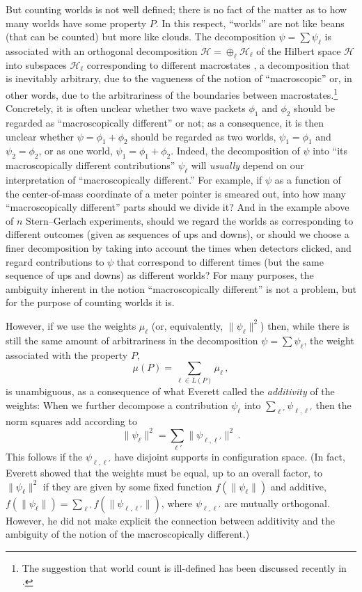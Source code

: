 \documentclass[12pt]{article}
\newcommand{\Hilbert}{\mathscr{H}}
\newcommand{\num}{n}
\newcommand{\Lset}{L}
\newcommand{\z}[1]{{#1}}
\begin{document}
But counting worlds is not well defined; there is no fact of the matter as to how many worlds have some property $P$. In this respect, ``worlds'' are not like beans (that can be counted) but more like clouds. The decomposition $\psi = \sum \psi_\ell$ \z{is associated with} an orthogonal decomposition $\Hilbert=\oplus_\ell \Hilbert_\ell$ of the Hilbert space $\Hilbert$ into subspaces $\Hilbert_\ell$ corresponding to different macrostates \cite{vN}, a decomposition that is inevitably arbitrary, due to the vagueness of the notion of ``macroscopic'' or, in other words, due to the arbitrariness of the boundaries between macrostates.\footnote{\z{The suggestion that world count is ill-defined has been  discussed recently in  \cite{wallace}.}} Concretely, it is often unclear whether two wave packets $\phi_1$ and $\phi_2$ should be regarded as ``macroscopically different'' or not; as a consequence, it is then unclear whether $\psi = \phi_1+\phi_2$ should be regarded as two worlds, $\psi_1=\phi_1$ and $\psi_2=\phi_2$, or as one world, $\psi_1=\phi_1+\phi_2$. Indeed, the decomposition of $\psi$ into ``its macroscopically different contributions'' $\psi_\ell$ will \emph{usually} depend on our interpretation of ``macroscopically different.'' For example, if $\psi$ as a function of the center-of-mass coordinate of a meter pointer is smeared out, into how many ``macroscopically different'' parts should we divide it? 
And in the example above of $\num$ Stern--Gerlach experiments, should we regard the worlds as corresponding to different outcomes (given as sequences of ups and downs), or should we choose a finer decomposition by taking into account the times when detectors clicked, and regard contributions to $\psi$ that correspond to different times (but the same sequence of ups and downs) as different worlds? For many purposes, the ambiguity inherent in the notion ``macroscopically different'' is not a problem, but for the purpose of counting worlds it is.

However, if we use the weights $\mu_\ell$ (or, equivalently, $\|\psi_\ell\|^2$) then, while there is still the same amount of arbitrariness in the decomposition $\psi=\sum\psi_\ell$, the weight associated with the property $P$, 
\[
\mu(P)=\sum_{\ell\in\Lset(P)}\mu_\ell\,,
\]
is unambiguous, as a consequence of what Everett \cite{evethesis,Eve57} called the \emph{additivity} of the weights: When we further decompose a contribution $\psi_\ell$ into $\sum_{\ell'} \psi_{\ell,\ell'}$ then the norm squares add according to
\begin{equation}
\|\psi_\ell\|^2 = \sum_{\ell'} \|\psi_{\ell,\ell'}\|^2\,.
\end{equation}
This follows if the $\psi_{\ell,\ell'}$ have disjoint supports in configuration space. (In fact, Everett showed that the weights must be equal, up to an overall factor, to $\|\psi_\ell\|^2$ if they are given by some fixed function $f(\|\psi_\ell\|)$ and additive, $f(\|\psi_\ell\|)= \sum_{\ell'} f(\|\psi_{\ell,\ell'}\|)$, where $\psi_{\ell,\ell'}$ are mutually orthogonal. However, he did not make explicit the connection between additivity and the ambiguity of the notion of the  macroscopically different.)
\end{document}
